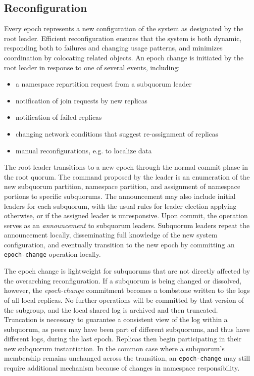 \documentclass[11pt,conference]{IEEEtran}
\begin{document}
\subsection{Reconfiguration}

Every epoch represents a new configuration of the system as designated
by the root leader.
Efficient reconfiguration ensures that the system is both dynamic,
responding both to failures and changing usage patterns, and minimizes
coordination by colocating related objects.
An epoch change is initiated by the root leader in response to one of
several events, including:

\begin{itemize}
    \item a namespace repartition request from a subquorum leader
    \item notification of join requests by new replicas
    \item notification of failed replicas
    \item changing network conditions that suggest re-assignment of replicas
    \item manual reconfigurations, e.g. to localize data
\end{itemize}

The root leader transitions to a new epoch through the normal commit
phase in the root quorum.
The command proposed by the leader is an enumeration of the new subquorum
partition, namespace partition, and assignment of namespace portions to
specific subquorums.
The announcement may also include initial leaders for each subquorum,
with the usual rules for leader election applying otherwise, or if the
assigned leader is unresponsive.
Upon commit, the operation serves as an \emph{announcement} to subquorum
leaders.
Subquorum leaders repeat the announcement locally, disseminating full
knowledge of the new system configuration, and eventually transition to
the new epoch by committing an \texttt{epoch-change} operation locally.

The epoch change is lightweight for subquorums that are not directly
affected by the overarching reconfiguration.
If a subquorum is being changed or dissolved, however, the
\emph{epoch-change} commitment becomes a tombstone written to the logs
of all local replicas.
No further operations will be committed by that version of the subgroup,
and the local shared log is archived and then truncated.
Truncation is necessary to guarantee a consistent view of the log within
a subquorum, as peers may have been part of different subquorums, and
thus have different logs, during the last epoch.
Replicas then begin participating in their new subquorum instantiation.
In the common case where a subquorum's membership remains unchanged
across the transition, an \texttt{epoch-change} may still require
additional mechanism because of changes in namespace responsibility.
\end{document}
